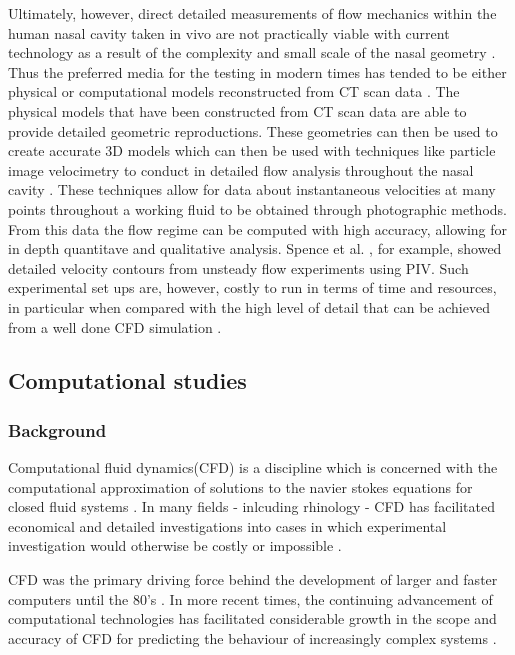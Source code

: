 Ultimately, however, direct detailed measurements of flow mechanics within the human nasal cavity taken in vivo are not practically viable with current technology as a result of the complexity and small scale of the nasal geometry \cite{Doorly2008c}. Thus the preferred media for the testing in modern times has tended to be either physical or computational models reconstructed from CT scan data \cite{Doorly2008c}. The physical models that have been constructed from CT scan data are able to provide detailed geometric reproductions.
These geometries can then be used to create accurate 3D models which can then be used with techniques like particle image velocimetry to conduct in detailed flow analysis throughout the nasal cavity \cite{Chung2008, Kelly2000}.
These techniques allow for data about instantaneous velocities at many points throughout a working fluid to be obtained through photographic methods. From this data the flow regime can be computed with high accuracy, allowing for in depth quantitave and qualitative analysis. Spence et al. \cite{Spence2012}, for example, showed detailed velocity contours from unsteady flow experiments using PIV.
Such experimental set ups are, however, costly to run in terms of time and resources, in particular when compared with the high level of detail that can be achieved from a well done CFD simulation \cite{Ma2009}.


\subsection{Computational studies}  
\subsubsection*{Background}
Computational fluid dynamics(CFD) is a discipline which is concerned with the computational approximation of solutions to the navier stokes equations for closed fluid systems \cite{Tu2008}. In many fields - inlcuding rhinology - CFD has facilitated economical and detailed investigations into cases in which experimental investigation would otherwise be costly or impossible \cite{Keyhani1995}.

CFD was the primary driving force behind the development of larger and faster computers until the 80's \cite{Wendt2009}. In more recent times, the continuing advancement of computational technologies has facilitated considerable growth in the scope and accuracy of CFD for predicting the behaviour of increasingly complex systems \cite{Tu2008}. 


